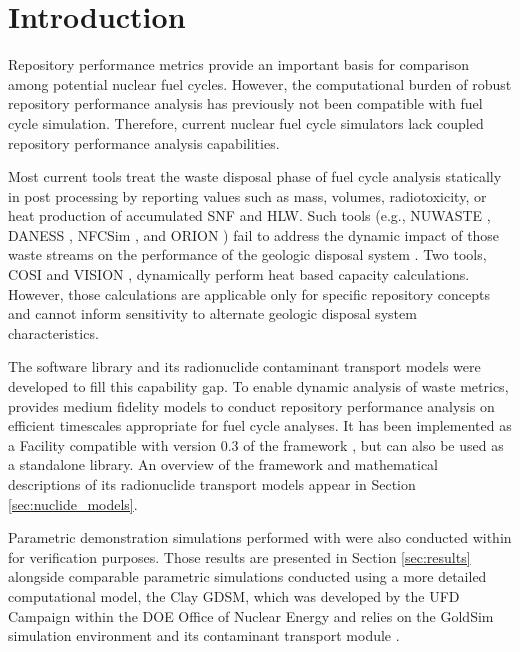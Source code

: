 \section{Introduction}\label{sec:introduction}
Repository performance metrics provide an important basis for comparison among
potential nuclear fuel cycles.
However, the computational
burden of robust repository performance analysis has previously not been
compatible with fuel cycle simulation.
Therefore, current nuclear fuel cycle simulators
lack coupled repository performance analysis capabilities.

Most current tools treat the waste disposal
phase of fuel cycle analysis statically in post processing by reporting
values such as mass, volumes, radiotoxicity, or heat production of accumulated
\gls{SNF} and \gls{HLW}. Such tools
(e.g.,
\gls{NUWASTE} \cite{abkowitz_nuclear_2010},
\gls{DANESS} \cite{van_den_durpel_daness:_2006},
\gls{NFCSim} \cite{schneider_nfcsim_2004}, and
ORION \cite{gregg_orion_2011})
fail to address the dynamic impact of those waste streams on the performance of the
geologic disposal system \cite{wilson_comparing_2011}.  Two tools, \gls{COSI}
\cite{boucher_international_2010} and \gls{VISION} \cite{yacout_vision_2006,
wilson_comparing_2011, radel_repository_2007, boucher_international_2010},
dynamically perform heat based capacity calculations.
However, those calculations are applicable only for specific
repository concepts and cannot inform sensitivity to alternate geologic disposal
system characteristics.

The \Cyder software library \cite{huff_cyder_2013} and its radionuclide
contaminant transport models were  developed to fill this capability gap.  To
enable dynamic analysis of waste metrics, \Cyder provides medium fidelity
models to conduct repository performance analysis on efficient timescales
appropriate for fuel cycle analyses. It has been implemented as a Facility
compatible with version 0.3 of the \Cyclus framework
\cite{wilson_cyclus:_2012}, but can also be used as a standalone library.  An
overview of the \Cyder framework and mathematical descriptions of its
radionuclide transport models appear in Section \ref{sec:nuclide_models}.

Parametric demonstration simulations performed with \Cyder were also conducted
within \Cyclus for verification purposes. Those results are presented in
Section \ref{sec:results} alongside comparable parametric simulations conducted
using a more detailed computational model, the Clay \gls{GDSM}, which was
developed by the \gls{UFD} Campaign within the \gls{DOE} Office of Nuclear
Energy \cite{clayton_generic_2011} and relies on the GoldSim simulation
environment \cite{golder_associates_goldsim_2010-1} and its contaminant
transport module \cite{golder_associates_goldsim_2010-1}.

